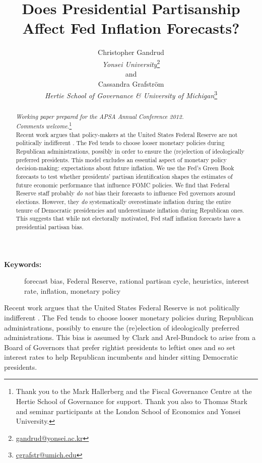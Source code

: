 \documentclass[a4paper]{article}
\title{Does Presidential Partisanship Affect Fed Inflation Forecasts?}
\author{Christopher Gandrud \\
                {\emph{Yonsei University}}\footnote{\href{mailto:gandrud@yonsei.ac.kr}{gandrud@yonsei.ac.kr}} \\
                and \\
            Cassandra Grafstr\"{o}m \\
                {\emph{Hertie School of Governance \& University of Michigan}}\footnote{\href{mailto:cgrafstr@umich.edu}{cgrafstr@umich.edu}}}
\begin{document}
\maketitle

\begin{abstract}
\noindent\emph{Working paper prepared for the APSA Annual Conference 2012. \\ Comments welcome.}\footnote{Thank you to the Mark Hallerberg and the Fiscal Governance Centre at the Hertie School of Governance for support. Thank you also to Thomas Stark and seminar participants at the London School of Economics and Yonsei University.} \\[0.2cm]

Recent work argues that policy-makers at the United States Federal Reserve are not politically indifferent \citep{Clark2012}. The Fed tends to choose looser monetary policies during Republican administrations, possibly in order to ensure the (re)election of ideologically preferred presidents. This model excludes an essential aspect of monetary policy decision-making: expectations about future inflation. We use the Fed's Green Book forecasts to test whether presidents' partisan identification shapes the estimates of future economic performance that influence FOMC policies. We find that Federal Reserve staff probably {\emph{do not}} bias their forecasts to influence Fed governors around elections. However, they {\emph{do}} systematically overestimate inflation during the entire tenure of Democratic presidencies and underestimate inflation during Republican ones. This suggests that while not electorally motivated, Fed staff inflation forecasts have a presidential partisan bias.

\end{abstract}

\begin{description}
  \item [{\textbf{Keywords:}}] forecast bias, Federal Reserve, rational partisan cycle, heuristics, interest rate, inflation, monetary policy
\end{description}

\vspace{0.3cm}

Recent work argues that the United States Federal Reserve is not politically indifferent \citep{Clark2012}. The Fed tends to choose looser monetary policies during Republican administrations, possibly to ensure the (re)election of ideologically preferred administrations. This bias is assumed by Clark and Arel-Bundock to arise from a Board of Governors that prefer rightist presidents to leftist ones and so set interest rates to help Republican incumbents and hinder sitting Democratic presidents. 
\end{document}
